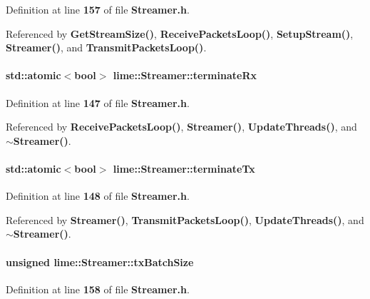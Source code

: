 Definition at line {\bf 157} of file {\bf Streamer.\+h}.



Referenced by {\bf Get\+Stream\+Size()}, {\bf Receive\+Packets\+Loop()}, {\bf Setup\+Stream()}, {\bf Streamer()}, and {\bf Transmit\+Packets\+Loop()}.

\paragraph[{terminate\+Rx}]{\setlength{\rightskip}{0pt plus 5cm}std\+::atomic$<$bool$>$ lime\+::\+Streamer\+::terminate\+Rx}\label{classlime_1_1Streamer_a88834a0ea3ec6d9df65d75db0091fd28}


Definition at line {\bf 147} of file {\bf Streamer.\+h}.



Referenced by {\bf Receive\+Packets\+Loop()}, {\bf Streamer()}, {\bf Update\+Threads()}, and {\bf $\sim$\+Streamer()}.

\paragraph[{terminate\+Tx}]{\setlength{\rightskip}{0pt plus 5cm}std\+::atomic$<$bool$>$ lime\+::\+Streamer\+::terminate\+Tx}\label{classlime_1_1Streamer_ac08fdbdb56cbe888e14c0d9daece9ac5}


Definition at line {\bf 148} of file {\bf Streamer.\+h}.



Referenced by {\bf Streamer()}, {\bf Transmit\+Packets\+Loop()}, {\bf Update\+Threads()}, and {\bf $\sim$\+Streamer()}.

\paragraph[{tx\+Batch\+Size}]{\setlength{\rightskip}{0pt plus 5cm}unsigned lime\+::\+Streamer\+::tx\+Batch\+Size}\label{classlime_1_1Streamer_ac3f56ce0e84b1556b77bf6a081e2fe09}


Definition at line {\bf 158} of file {\bf Streamer.\+h}.



